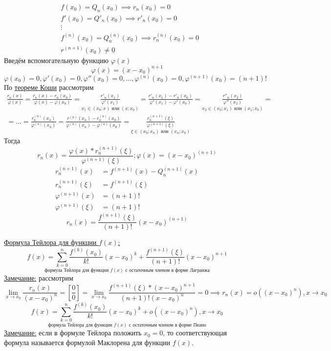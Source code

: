 \documentclass[12pt]{article}
\begin{document}
    \begin{adjustwidth}{1.5em}{1.5em}
        \begin{align*}
            &f(x_0) = Q_n(x_0) \implies r_n(x_0) = 0\\
            &f'(x_0) = Q'_n(x_0) \implies r'_n(x_0) = 0\\
            &\vdots\\
            &f^{(n)}(x_0) = Q^{(n)}_n(x_0) \implies r^{(n)}_n(x_0) = 0\\
            &r^{(n+1)}(x_0) \ne 0
        \end{align*}
        Введём вспомогательную функцию $\varphi(x)$
        \[ \varphi(x) = (x-x_0)^{n+1} \]
        \[ \varphi(x_0) = 0, \varphi'(x_0) = 0, \varphi''(x_0) = 0, \dots, \varphi^{(n)}(x_0) = 0, \varphi^{(n+1)}(x_0) = (n+1)! \]
        По \hyperref[th:4.12.3]{теореме Коши} рассмотрим
        \begin{multline*}
            \boxed{ \frac{r_n(x)}{\varphi(x)} } = \frac{r_n(x) - r_n(x_0)}{\varphi(x) - \varphi(x_0)} = \underset{x_1 \in (x_0; x) \text{ или } (x; x_0)}{\frac{r'_n(x_1)}{\varphi'(x_1)}} = \frac{r'_n(x_1) - r'_n(x_0)}{\varphi'(x_1) - \varphi'(x_0)} = \underset{x_2 \in (x_0; x_1) \text{ или } (x_1; x_0)}{\frac{r''_n(x_2)}{\varphi''(x_2)}} =\\
            = \dots = \frac{r^{(n)}_n(x_n)}{\varphi^{(n)}(x_n)} = \frac{r^{(n)}(x_n) - r^{(n)}_n(x_0)}{\varphi^{(n)}(x_n)-\varphi^{(n)}(x_0)} = \underset{\xi \in (x_0;x_n) \text{ или } (x_n; x_0)}{\boxed{\frac{r^{(n+1)}_n(\xi)}{\varphi^{(n+1)}(\xi)}}}
        \end{multline*}
        Тогда \[ r_n(x) = \frac{\varphi(x) * r^{(n+1)}_n(\xi)}{\varphi^{(n+1)}(\xi)}; \varphi(x) = (x-x_0)^{(n+1)} \]
        \begin{align*}
            r^{(n+1)}_n (x) &= f^{(n+1)}(x) - Q^{(n+1)}_n(x)\\
            r^{(n+1)}_n (\xi) &= f^{(n+1)}(\xi)\\
            \varphi^{(n+1)} (x) &= (n+1)!\\
            \varphi^{(n+1)} (\xi) &= (n+1)!
        \end{align*}
        \[ r_n(x) = \frac{f^{(n+1)}(\xi)}{(n+1)!}(x-x_0)^{(n+1)} \]
    \end{adjustwidth}
    \underline{Формула Тейлора для функции $f(x)$:}
    \[ \underset{\text{формула Тейлора для функции }f(x)\text{ с остаточным членом в форме Лагранжа}}{\boxed{ f(x) = \sum_{k = 0}^{n} \frac{f^{(k)}(x_0)}{k!}(x-x_0)^k + \frac{f^{(n+1)}(\xi)}{(n+1)!}(x-x_0)^{n+1} }} \]
    \underline{Замечание:} рассмотрим 
    \[ \lim_{x\to x_0}\frac{r_n(x)}{(x-x_0)^n} = \left[\frac{0}{0}\right] = \lim_{x\to x_0} \frac{f^{(n+1)}(\xi) * (x-x_0)^{n+1}}{(n+1)!(x-x_0)^n} = 0 \implies r_n(x) = o((x-x_0)^n), x \to x_0 \]
    \[ \underset{\text{формула Тейлора для функции }f(x)\text{ с остаточным членом в форме Пеано}}{ \boxed{ f(x) = \sum_{k=0}^{n}\frac{f^{(k)}(x_0)}{k!}(x-x_0)^k + o((x-x_0)^n), x \to x_0 } } \]
    \underline{Замечание:} если в формуле Тейлора положить $x_0 = 0$, то соответствующая формула называется формулой Маклорена для функции $f(x)$.
\end{document}
